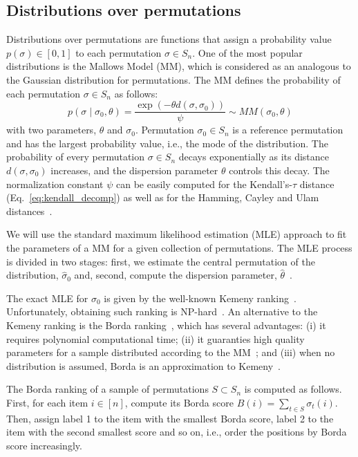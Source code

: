 \documentclass[sigconf,dvipsnames]{acmart}
\newcommand{\Prob}{\ensuremath{p}}
\begin{document}
\subsection{Distributions over permutations}
Distributions over permutations are functions that assign a probability value  $\Prob(\sigma)\in[0,1]$ to each permutation $\sigma \in S_n$. One of the most popular distributions is the Mallows Model (MM), which is considered as an analogous to the Gaussian distribution for permutations. The MM defines the probability of each permutation $\sigma\in S_n$ as follows:
%
\begin{equation}\label{eq:MM}
\Prob(\sigma \mid \sigma_0, \theta )= \frac{\exp(-\theta d(\sigma, \sigma_0))}{\psi} \sim MM(\sigma_0, \theta)
\end{equation}
%
with two parameters, $\theta$ and $\sigma_0$. Permutation $\sigma_0\in S_n$ is a reference permutation and has the largest probability value, i.e., the mode of the distribution. The probability of every permutation $\sigma\in S_n$ decays exponentially as its distance $d(\sigma,\sigma_0)$ increases, and the dispersion parameter $\theta$  controls this decay.  The normalization constant $\psi$ can be easily computed for the Kendall's-$\tau$ distance (Eq.~\ref{eq:kendall_decomp}) as well as for the Hamming, Cayley and Ulam distances~\cite{IruCalLoz2016permallows}.


We will use the standard maximum likelihood estimation (MLE) approach to fit the parameters of a MM for a given collection of permutations. 
The MLE process is divided in two stages: first, we estimate the central permutation of the distribution, $\hat{\sigma}_0$ and, second, compute the dispersion parameter, $\hat\theta$~\cite{IruCalLoz2016permallows}. 

The exact MLE for $\sigma_0$ is given by the well-known Kemeny ranking~\cite{DwoKumNao2001rank}. Unfortunately,  obtaining such ranking is NP-hard~\cite{DwoKumNao2001rank}. An alternative to the Kemeny ranking is the Borda ranking~\cite{AliMei2011kemeny}, which has several advantages: (i) it requires polynomial computational time; (ii) it  guaranties  high quality parameters for a sample distributed according to the MM~\cite{CarProSha2013votes}; and (iii) when no distribution is assumed, Borda is an approximation to Kemeny~\cite{CopFleRur2010ordering}.

The Borda ranking of a sample of permutations $S \subset S_n$ is computed as follows. 
First, for each item $i \in [n]$, compute its Borda score $B(i) =  \sum_{t\in S}  \sigma_t(i)$. Then, assign label 1 to the item with the smallest Borda score, label 2 to the item with the second smallest score and so on, i.e., order the positions by Borda score increasingly.
\end{document}
